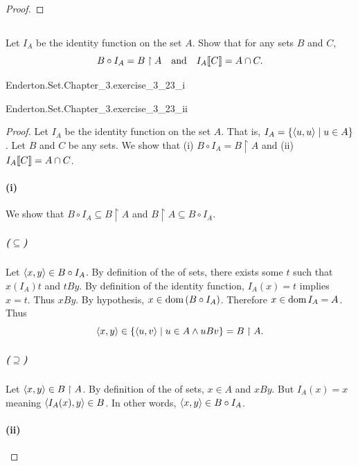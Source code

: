 \documentclass{report}
\begin{document}
\begin{proof}
  \end{proof}

\subsection{}%

  Let $I_A$ be the identity function on the set $A$.
  Show that for any sets $B$ and $C$,
    $$B \circ I_A = B \restriction A \quad\text{and}\quad
      I_A\!\left\llbracket C\right\rrbracket = A \cap C.$$

    {Enderton.Set.Chapter\_3.exercise\_3\_23\_i}

    {Enderton.Set.Chapter\_3.exercise\_3\_23\_ii}

  \begin{proof}
    Let $I_A$ be the identity function on the set $A$.
    That is, $I_A = \{\left< u, u \right> \mid u \in A\}$.
    Let $B$ and $C$ be any sets.
    We show that (i) $B \circ I_A = B \restriction A$ and (ii)
      $I_A\!\left\llbracket C\right\rrbracket = A \cap C$.

    \paragraph{(i)}%

      We show that $B \circ I_A \subseteq B \restriction A$ and
        $B \restriction A \subseteq B \circ I_A$.

      \subparagraph{($\subseteq$)}%

        Let $\left< x, y \right> \in B \circ I_A$.
        By definition of the  of sets,
          there exists some $t$ such that $x(I_A)t$ and $tBy$.
        By definition of the identity function, $I_A(x) = t$ implies $x = t$.
        Thus $xBy$.
        By hypothesis, $x \in \mathop{\text{dom}}{(B \circ I_A)}$.
        Therefore $x \in \mathop{\text{dom}}{I_A} = A$.
        Thus $$\left< x, y \right> \in \{\left< u, v \right> \mid u \in A \land uBv\}
          = B \restriction A.$$

      \subparagraph{($\supseteq$)}%

        Let $\left< x, y \right> \in B \restriction A$.
        By definition of the  of sets,
          $x \in A$ and $xBy$.
        But $I_A(x) = x$ meaning $\left< I_A(x), y \right> \in B$.
        In other words, $\left< x, y \right> \in B \circ I_A$.

    \paragraph{(ii)}%


\end{proof}
\end{document}
